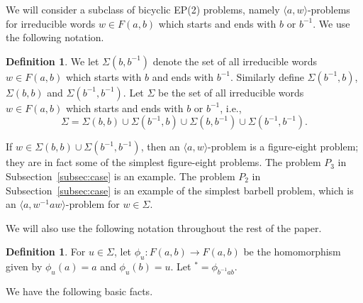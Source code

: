\documentclass[10pt,a4paper]{amsart}
\theoremstyle{definition}
\newtheorem{definition}[theorem]{Definition}
\theoremstyle{definition}
\numberwithin{equation}{section}
\begin{document}
We will consider a subclass of bicyclic EP(2) problems, namely $\langle a, w\rangle$-problems for irreducible words $w\in F(a, b)$ which starts and ends with $b$ or $b^{-1}$. We use the following notation.

\begin{definition} We let $\Sigma(b, b^{-1})$ denote the set of all irreducible words $w\in F(a, b)$ which starts with $b$ and ends with $b^{-1}$. Similarly define $\Sigma(b^{-1}, b)$, $\Sigma(b, b)$ and $\Sigma(b^{-1}, b^{-1})$. Let $\Sigma$ be the set of all irreducible words $w\in F(a, b)$ which starts and ends with $b$ or $b^{-1}$, i.e., 
$$ \Sigma=\Sigma(b,b)\cup \Sigma(b^{-1}, b)\cup \Sigma(b, b^{-1})\cup \Sigma(b^{-1}, b^{-1}). $$
\end{definition}

If $w\in \Sigma(b, b)\cup \Sigma(b^{-1}, b^{-1})$, then an $\langle a, w\rangle$-problem is a figure-eight problem; they are in fact some of the simplest figure-eight problems. The problem $P_3$ in Subsection~\ref{subsec:case} is an example. The problem $P_2$ in Subsection~\ref{subsec:case} is an example of the simplest barbell problem, which is an $\langle a, w^{-1}aw\rangle$-problem for $w\in \Sigma$. 

We will also use the following notation throughout the rest of the paper.

\begin{definition}\label{def:*} For $u\in \Sigma$, let $\phi_u\colon F(a, b)\to F(a, b)$ be the homomorphism given by $\phi_u(a)=a$ and $\phi_u(b)=u$. Let ${}^*=\phi_{b^{-1}ab}$.
\end{definition}

We have the following basic facts.
\end{document}
